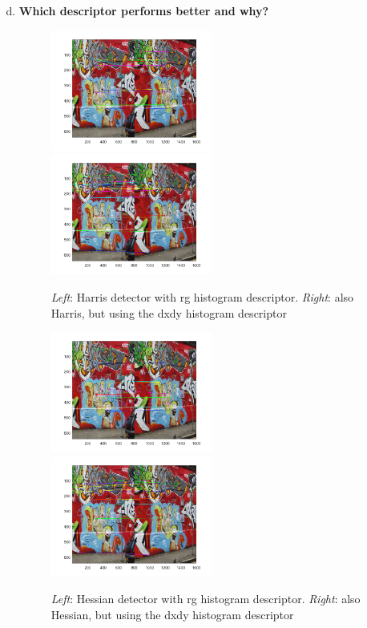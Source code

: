 \documentclass[12pt]{article}
\begin{document}
\begin{enumerate}[a)]
	\setcounter{enumi}{3}
	\item 	
	\textbf{Which descriptor performs better and why?}\\
	
	\begin{figure}[h]
		\includegraphics[width=0.5\textwidth]{graf_har_rg}
		\includegraphics[width=0.5\textwidth]{graf_har_dxdy}
		\caption{\textit{Left}: Harris detector with rg histogram descriptor. \textit{Right}: also Harris, but using the dxdy histogram descriptor }
	\end{figure}

	\begin{figure}[h]			
		\includegraphics[width=0.5\textwidth]{graf_hes_rg}
		\includegraphics[width=0.5\textwidth]{graf_hes_dxdy}
		\caption{\textit{Left}: Hessian detector with rg histogram descriptor. \textit{Right}: also Hessian, but using the dxdy histogram descriptor }
	\end{figure}
	

\end{enumerate}
\end{document}
